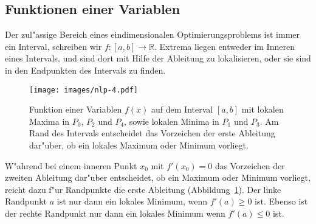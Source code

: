 \subsection{Funktionen einer Variablen}
Der zul"assige Bereich eines eindimensionalen Optimierungsproblems
ist immer ein Interval, schreiben wir $f\colon[a,b]\to\mathbb R$.
Extrema
liegen entweder im Inneren eines Intervals, und sind dort mit
Hilfe der Ableitung zu lokalisieren, oder sie sind in den
Endpunkten des Intervals zu finden.
\begin{figure}
\begin{center}
\texttt{[image: images/nlp-4.pdf]}
\end{center}
\caption{Funktion einer Variablen $f(x)$ auf dem Interval $[a,b]$ mit
lokalen Maxima in  $P_0$, $P_2$ und $P_4$, sowie lokalen Minima in
$P_1$ und $P_3$. Am Rand des Intervals entscheidet das Vorzeichen der
erste Ableitung dar"uber, ob ein lokales Maximum oder Minimum 
vorliegt.\label{nlp:funktion1var}}
\end{figure}

W"ahrend bei einem inneren Punkt $x_0$ mit $f'(x_0)=0$
das Vorzeichen der zweiten Ableitung dar"uber entscheidet,
ob ein Maximum oder Minimum vorliegt, reicht dazu f"ur
Randpunkte die erste Ableitung (Abbildung~\ref{nlp:funktion1var}).
Der linke Randpunkt $a$ ist nur dann ein lokales Minimum, wenn $f'(a)\ge 0$
ist.
Ebenso ist der rechte Randpunkt nur dann ein lokales Minimum wenn
$f'(a)\le 0$ ist.

